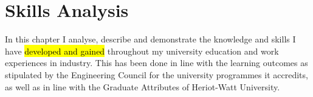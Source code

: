 \chapter{Skills Analysis} %

\label{Chapter3} %


In this chapter I analyse, describe and demonstrate the knowledge and skills I have \hl{developed and gained} throughout my university education and work experiences in industry.
This has been done in line with the learning outcomes as stipulated by the Engineering Council for the university programmes it accredits, as well as in line with the Graduate Attributes of Heriot-Watt University.


